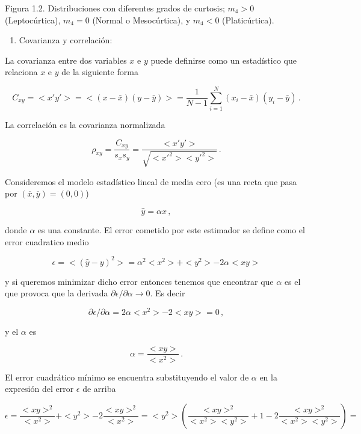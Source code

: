 \documentclass[
]{agujournal2019}
\providecommand{\tightlist}{%
  \setlength{\itemsep}{0pt}\setlength{\parskip}{0pt}}\usepackage{longtable,booktabs,array}
\begin{document}
\begin{center}
\end{center}

\begin{center}
Figura 1.2. Distribuciones con diferentes grados de curtosis; $m_4>0$ (Leptocúrtica),
$m_4=0$ (Normal o Mesocúrtica), y $m_4<0$ (Platicúrtica).
\end{center}

\vspace{0.5cm}

\begin{enumerate}
\def\labelenumi{(\arabic{enumi})}
\setcounter{enumi}{4}
\tightlist
\item
  Covarianza y correlación:\\
\end{enumerate}

La covarianza entre dos variables \(x\) e \(y\) puede definirse como un
estadístico que relaciona \(x\) e \(y\) de la siguiente forma

\[C_{xy}=<x'y'>=<(x-\bar{x})(y-\bar{y})>=\frac{1}{N-1}\sum\limits^N_{i=1} (x_i-\bar{x})(y_i-\bar{y})\,.\]

La correlación es la covarianza normalizada

\[\rho_{x y}=\frac{C_{x y}}{s_x s_y}=\frac{<x' y'>}{\sqrt{<x'^2><y'^2>}}\,. \]

Consideremos el modelo estadístico lineal de media cero (es una recta
que pasa por \((\overline{x},\overline{y})=(0,0)\))

\[\hat{y}=\alpha x\,,\]

donde \(\alpha\) es una constante. El error cometido por este estimador
se define como el error cuadratico medio

\[\epsilon=<(\hat{y}-y)^2>=\alpha^2<x^2>+<y^2>-2\alpha<xy>\]

y si queremos minimizar dicho error entonces tenemos que encontrar que
\(\alpha\) es el que provoca que la derivada
\(\partial{\epsilon}/\partial{\alpha}\rightarrow{0}\). Es decir

\[\partial{\epsilon}/\partial{\alpha}=2\alpha<x^2>-2<xy>=0\,,\]

y el \(\alpha\) es

\[\alpha=\frac{<xy>}{<x^2>}\,.\]

El error cuadrático mínimo se encuentra substituyendo el valor de
\(\alpha\) en la expresión del error \(\epsilon\) de arriba

\[\epsilon=\frac{<xy>^2}{<x^2>} + <y^2> - 2\frac{<xy>^2}{<x^2>}=
           <y^2>\left(\frac{<xy>^2}{<x^2><y^2>}+1-2\frac{<xy>^2}{<x^2><y^2>}\right)=\]
\end{document}
